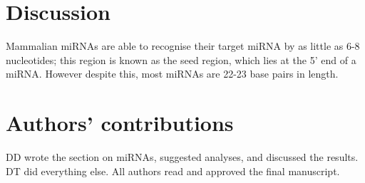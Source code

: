 \documentclass{article}
\begin{document}
\section{Discussion}\label{discussion}

Mammalian miRNAs are able to recognise their target miRNA by as little as 6-8 nucleotides; this region is known as the seed region, which lies at the 5' end of a miRNA. However despite this, most miRNAs are 22-23 base pairs in length.

\section{Authors' contributions}

DD wrote the section on miRNAs, suggested analyses, and discussed the results. DT did everything else. All authors read and approved the final manuscript.

\newpage



\end{document}
